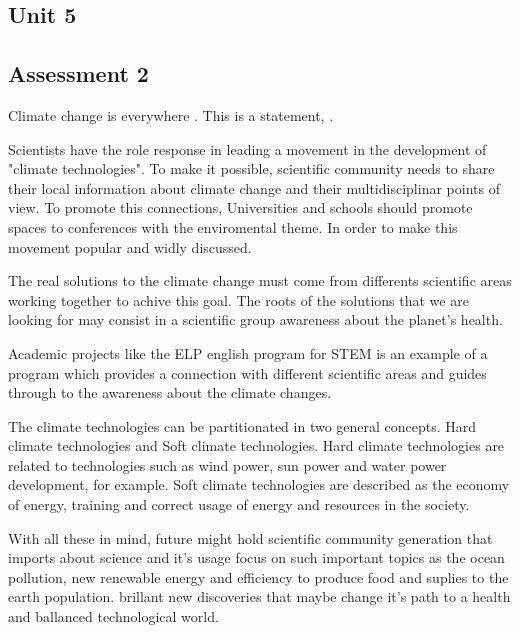 \documentclass[11pt]{report}
\begin{document}
\begin{mainf} %
\chapter{Unit 5}
\section*{Assessment 2}
    Climate change is everywhere \cite{behrens_lemuridae_2016}.
    This is a statement, \cite{lake_white_1979}.
    
   
    Scientists have the role response in leading a movement in the development of "climate technologies". To make it possible, scientific community needs to share their local information about climate change and their multidisciplinar points of view. To promote this connections, Universities and schools should promote spaces to conferences with the enviromental theme. In order to make this movement popular and widly discussed.

    The real solutions to the climate change must come from differents scientific areas working together to achive this goal.  The roots of the solutions that we are looking for may consist in a scientific group awareness about the planet's health.
     
    Academic projects like the ELP english program for STEM is an example of a program which provides a connection with different scientific areas and guides through to the awareness about the climate changes.

    The climate technologies can be partitionated in two general concepts. Hard climate technologies and Soft climate technologies. Hard climate technologies are related to technologies such as wind power, sun power and water power development, for example. Soft climate technologies are described as the economy of energy, training and correct usage of energy and resources in the society.

    With all these in mind, future might hold scientific community generation that imports about science and it's usage focus on such important topics as the ocean pollution, new renewable energy and efficiency to produce food and suplies to the earth population.
    brillant new discoveries that maybe change it's path to a health and ballanced technological world.

    




\end{mainf}
\end{document}
